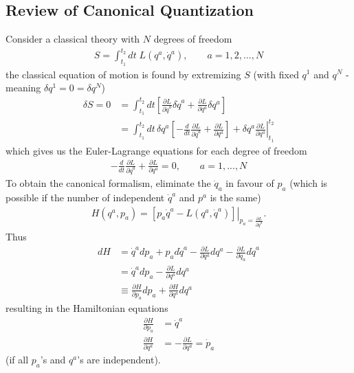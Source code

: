\documentclass{article}
\begin{document}
\subsection{Review of Canonical Quantization}
Consider a classical theory with $N$ degrees of freedom
\begin{align}
S=\int_{t_1}^{t_2}dt\;L(q^a,\dot{q}^a),\qquad a=1,2,...,N
\end{align}
the classical equation of motion is found by extremizing $S$ (with fixed  $q^1$ and $q^N$ - meaning $\delta q^1=0=\delta q^N$)
\begin{align}
\delta S=0
&=\int_{t_1}^{t_2}dt\left[\frac{\partial L}{\partial\dot{q}^a}\delta\dot{q}^a+\frac{\partial L}{\partial q^a}\delta q^a\right]\\
&=\int_{t_1}^{t_2}dt\,\delta q^a\left[-\frac{d}{dt}\frac{\partial L}{\partial\dot{q}^a}+\frac{\partial L}{\partial q^a}\right]+\left.\delta q^a\frac{\partial L}{\partial q^a}\right|_{t_1}^{t_2}
\end{align}
which gives us the Euler-Lagrange equations for each degree of freedom
\begin{align}
-\frac{d}{dt}\frac{\partial L}{\partial\dot{q}^a}+\frac{\partial L}{\partial q^a}=0, \qquad a=1,..., N
\end{align}
To obtain the canonical formalism, eliminate the $\dot{q}_a$ in favour of $p_a$ (which is possible if the number of independent $\dot{q}^a$ and $p^a$ is the same)
\begin{align}
H(q^a,p_a)=\left.\left[p_a\dot{q}^a-L(q^a,\dot{q}^a)\right]\right|_{p_a=\frac{\partial L}{\partial \dot{q}^a}}.
\end{align}
Thus
\begin{align}
dH
&=\dot{q}^a dp_a+p_a d\dot{q}^a-\frac{\partial L}{\partial q^a}dq^a-\frac{\partial L}{\partial \dot{q}_a} d\dot{q}^a\\
&=\dot{q}^a dp_a-\frac{\partial L}{\partial q^a}dq^a\\
&\equiv\frac{\partial H}{\partial p_a}dp_a+\frac{\partial H}{\partial q^a}dq^a
\end{align}
resulting in the Hamiltonian equations
\begin{align}
\frac{\partial H}{\partial p_a}&=\dot{q}^a\\
\frac{\partial H}{\partial q^a}&=-\frac{\partial L}{\partial q^a}=\dot{p}_a
\end{align}
(if all $p_a$'s and $q^a$'s are independent).
\end{document}
